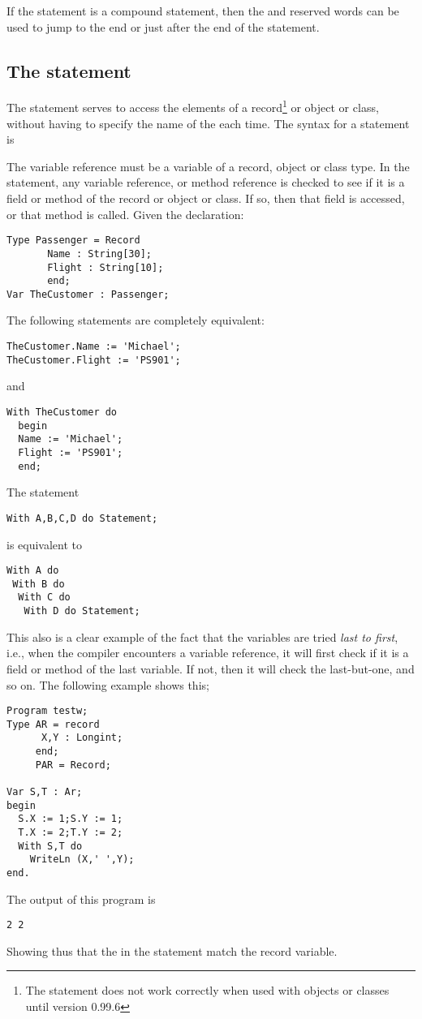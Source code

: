 \documentclass{report}
\begin{document}
If the statement is a compound statement, then  the  and 
 reserved words can be used to jump to the end or just 
after the end of the  statement.

\subsection{The  statement}
\label{se:With}
The  statement serves to access the elements of a record\footnote{
The  statement does not work correctly when used with
objects or classes until version 0.99.6}
or object or class, without having to specify the name of the each time.
The syntax for a  statement is

The variable reference must be a variable of a record, object or class type.
In the  statement, any variable reference, or method reference is
checked to see if it is a field or method of the record or object or class.
If so, then that field is accessed, or that method is called.
Given the declaration:
\begin{verbatim}
Type Passenger = Record
       Name : String[30];
       Flight : String[10];
       end;
Var TheCustomer : Passenger;
\end{verbatim}
The following statements are completely equivalent:
\begin{verbatim}
TheCustomer.Name := 'Michael';
TheCustomer.Flight := 'PS901';
\end{verbatim}
and
\begin{verbatim}
With TheCustomer do
  begin
  Name := 'Michael';
  Flight := 'PS901';
  end;
\end{verbatim}
The statement
\begin{verbatim}
With A,B,C,D do Statement;
\end{verbatim}
is equivalent to
\begin{verbatim}
With A do
 With B do
  With C do
   With D do Statement;
\end{verbatim}
This also is a clear example of the fact that the variables are tried {\em last
to first}, i.e., when the compiler encounters a variable reference, it will
first check if it is a field or method of the last variable. If not, then it
will check the last-but-one, and so on.
The following example shows this;
\begin{verbatim}
Program testw;
Type AR = record
      X,Y : Longint;
     end;
     PAR = Record;
    
Var S,T : Ar;
begin
  S.X := 1;S.Y := 1;
  T.X := 2;T.Y := 2;
  With S,T do
    WriteLn (X,' ',Y);
end.
\end{verbatim}
The output of this program is
\begin{verbatim}
2 2
\end{verbatim}
Showing thus that the  in the  statement match the
 record variable.
\end{document}
